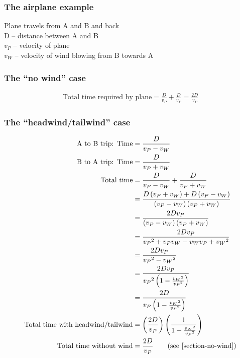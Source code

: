\documentclass[pagesize,headsepline,10pt,parskip=half]{scrreprt}
\begin{document}
        \subsubsection{The airplane example}
          Plane travels from A and B and back\\
          D – distance between A and B\\
          $v_P$ – velocity of plane\\
          $v_W$ – velocity of wind blowing from B towards A\\

        \subsubsection{The “no wind” case}\label{section-no-wind}
          \begin{align*}
            \text{Total time required by plane} = \frac{D}{v_P} + \frac{D}{v_P} = \frac{2D}{v_P}
          \end{align*}

        \subsubsection{The “headwind/tailwind” case}
          \begin{align*}
            \text{A to B trip: Time} &= \frac{D}{v_P - v_W}\\
            \text{B to A trip: Time} &= \frac{D}{v_P + v_W}\\
            \text{Total time} &= \frac{D}{v_P - v_W} + \frac{D}{v_P + v_W}\\
            &= \frac{D\left(v_P + v_W\right) + D\left(v_P - v_W\right)}{\left(v_P - v_W\right) \left(v_P + v_W\right)}\\
            &= \frac{2 D v_P}{\left(v_P - v_W\right) \left(v_P + v_W\right)}\\
            &= \frac{2 D v_P}{{v_P}^2 + v_P v_W - v_W v_P + {v_W}^2}\\
            &= \frac{2 D v_P}{{v_P}^2 - {v_W}^2}\\
            &= \frac{2 D v_P}{{v_P}^2 \left(1 - \frac{{v_W}^2}{{v_P}^2}\right)}\\
            &= \frac{2 D}{{v_P} \left(1 - \frac{{v_W}^2}{{v_P}^2}\right)}\\
            \text{Total time with headwind/tailwind} &= \left(\frac{2 D}{v_P}\right) \left(\frac{1}{1 - \frac{{v_W}^2}{{v_P}^2}}\right)\\
            \text{Total time without wind} &= \frac{2 D}{v_P} \qquad \text{(see~\ref{section-no-wind})}
          \end{align*}
\end{document}
